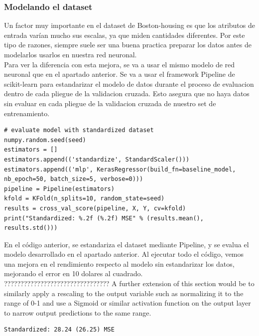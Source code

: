 \subsubsection{Modelando el dataset}
Un factor muy importante en el dataset de Boston-housing es que los atributos de entrada varían mucho sus escalas, ya que miden cantidades diferentes. Por este tipo de razones, siempre suele ser una buena practica preparar los datos antes de modelarlos usarlos en nuestra red neuronal.\\
Para ver la diferencia con esta mejora, se va a usar el mismo modelo de red neuronal que en el apartado anterior. Se va a usar el framework Pipeline de scikit-learn para estandarizar el modelo de datos durante el proceso de evaluacion dentro de cada pliegue de la validacion cruzada. Esto asegura que no haya datos sin evaluar en cada pliegue de la validacion cruzada de nuestro set de entrenamiento.
\begin{verbatim}
# evaluate model with standardized dataset
numpy.random.seed(seed)
estimators = []
estimators.append(('standardize', StandardScaler()))
estimators.append(('mlp', KerasRegressor(build_fn=baseline_model, nb_epoch=50, batch_size=5, verbose=0)))
pipeline = Pipeline(estimators)
kfold = KFold(n_splits=10, random_state=seed)
results = cross_val_score(pipeline, X, Y, cv=kfold)
print("Standardized: %.2f (%.2f) MSE" % (results.mean(), results.std()))
\end{verbatim}
En el código anterior, se estandariza el dataset mediante Pipeline, y se evalua el modelo desarrollado en el apartado anterior. Al ejecutar todo el código, vemos una mejora en el rendimiento respecto al modelo sin estandarizar los datos, mejorando el error en 10 dolares al cuadrado.\\
????????????????????????????????
A further extension of this section would be to similarly apply a rescaling to the output variable such as normalizing it to the range of 0-1 and use a Sigmoid or similar activation function on the output layer to narrow output predictions to the same range.
\begin{verbatim}
Standardized: 28.24 (26.25) MSE
\end{verbatim}
